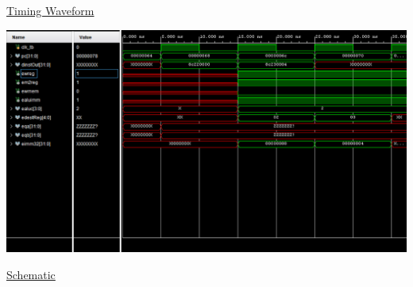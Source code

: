 \documentclass[11pt]{article}
\begin{document}
\begin{center}
    \underline{Timing Waveform}

    \includegraphics[width = 1\textwidth]{timing.png}
    
    \newpage

    \underline{Schematic}


\end{center}
\end{document}
